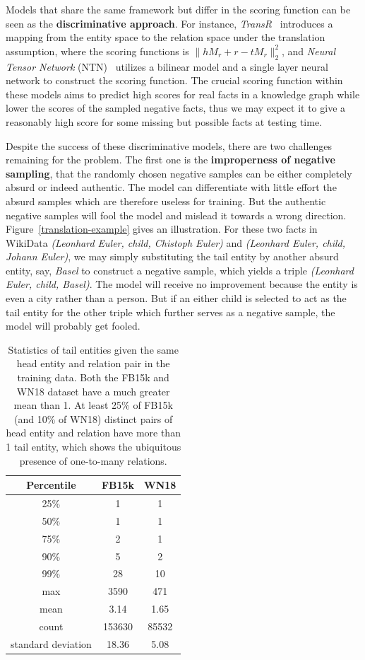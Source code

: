 \documentclass[twocolumn,a4paper,10pt,review,5p]{elsarticle}
\begin{document}
Models that share the same framework but differ in the scoring function can be seen as the \textbf{discriminative approach}. For instance, \emph{TransR}~\cite{TransR2015} introduces a mapping from the entity space to the relation space under the translation assumption, where the scoring functions is $\lVert h M_r + r - t M_r \rVert_2^2 $, and \emph{Neural Tensor Network} (NTN)~\cite{NTN} utilizes a bilinear model and a single layer neural network to construct the scoring function. The crucial scoring function within these models aims to predict high scores for real facts in a knowledge graph while lower the scores of the sampled negative facts, thus we may expect it to give a reasonably high score for some missing but possible facts at testing time.

Despite the success of these discriminative models, there are two challenges remaining for the problem.
The first one is the \textbf{improperness of negative sampling}, that the randomly chosen negative samples can be either completely absurd or indeed authentic.
The model can differentiate with little effort the absurd samples which are therefore useless for training. But the authentic negative samples will fool the model and mislead it towards a wrong direction. Figure~\ref{translation-example} gives an illustration. For these two facts in WikiData \emph{(Leonhard Euler, child, Chistoph Euler)} and \emph{(Leonhard Euler, child, Johann Euler)}, we may simply substituting the tail entity by another absurd entity, say, \emph{Basel} to construct a negative sample, which yields a triple \emph{(Leonhard Euler, child, Basel)}. The model will receive no improvement because the entity is even a city rather than a person. But if an either child is selected to act as the tail entity for the other triple which further serves as a negative sample, the model will probably get fooled.

\begin{table}
    \centering
    \begin{tabular}{ccc}
        \toprule
        Percentile & FB15k & WN18 \\
        \midrule
        25\% &  1   & 1  \\
        50\% &  1   & 1 \\
        75\% &  2   & 1 \\
        90\% &  5   & 2 \\
        99\% &  28  & 10 \\
        max & 3590  &  471 \\
        \midrule
        mean &  3.14 & 1.65 \\
        count & 153630 & 85532 \\
        standard deviation & 18.36 & 5.08 \\
        \bottomrule
    \end{tabular}
    \caption{Statistics of tail entities given the same head entity and relation pair in the training data. Both the FB15k and WN18 dataset have a much greater mean than 1. At least 25\% of FB15k (and 10\% of WN18) distinct pairs of head entity and relation have more than 1 tail entity, which shows the ubiquitous presence of one-to-many relations. }
\label{one-to-many}
\end{table}
\end{document}
